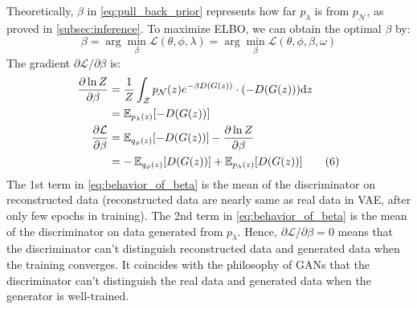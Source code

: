 Theoretically, $\beta$ in \cref{eq:pull_back_prior} represents how far $p_\lambda$ is from $p_\mathcal{N}$, as proved in \cref{subsec:inference}.
To maximize ELBO, we can obtain the optimal $\beta$ by:
\begin{equation}
	\beta = \arg \min_{\beta} \mathcal{L}(\theta, \phi, \lambda) = \arg \min_{\beta} \mathcal{L}(\theta, \phi, \beta, \omega) \tag{5}
\end{equation}
The gradient $\partial \mathcal{L}/\partial \beta$ is:
\begin{align*}\label{eq:behavior_of_beta}
\frac{\partial \ln Z}{\partial \beta} &= \frac{1}{Z} \int_{\mathcal{Z}} p_\mathcal{N}(z) e^{-\beta D(G(z))} \cdot (-D(G(z))) \mathrm{d} z \\
&=  \operatorname{\mathbb{E}}_{p_\lambda(z)} [- D(G(z))]  \\
\frac{\partial \mathcal{L}}{\partial \beta} &= \operatorname{\mathbb{E}}_{q_\phi(z)}[ -D(G(z))] - \frac{\partial \ln Z}{\partial \beta} \\
&= - \operatorname{\mathbb{E}}_{q_\phi(z)}[ D(G(z))] + \operatorname{\mathbb{E}}_{p_\lambda(z)}[ D(G(z))]   \tag{6}
\end{align*}
The 1st term in \cref{eq:behavior_of_beta} is the mean of the discriminator on reconstructed data (reconstructed data are nearly same as real data in VAE, after only few epochs in training). 
The 2nd term in \cref{eq:behavior_of_beta} is the mean of the discriminator on data generated from $p_\lambda$. 
Hence, $\partial \mathcal{L}/\partial \beta = 0$ means that the discriminator can't distinguish reconstructed data and generated data when the training converges. It coincides with the philosophy of GANs that the discriminator can't distinguish the real data and generated data when the generator is well-trained.	

